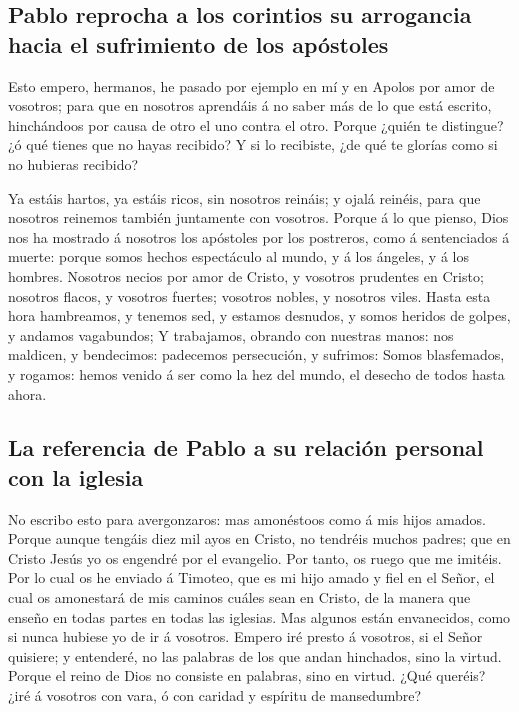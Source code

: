 \hypertarget{pablo-reprocha-a-los-corintios-su-arrogancia-hacia-el-sufrimiento-de-los-apuxf3stoles}{%
\subsection{Pablo reprocha a los corintios su arrogancia hacia el
sufrimiento de los
apóstoles}\label{pablo-reprocha-a-los-corintios-su-arrogancia-hacia-el-sufrimiento-de-los-apuxf3stoles}}

 Esto empero, hermanos, he pasado por ejemplo en mí y en
Apolos por amor de vosotros; para que en nosotros aprendáis á no saber
más de lo que está escrito, hinchándoos por causa de otro el uno contra
el otro.  Porque ¿quién te distingue? ¿ó qué tienes que no
hayas recibido? Y si lo recibiste, ¿de qué te glorías como si no
hubieras recibido?

 Ya estáis hartos, ya estáis ricos, sin nosotros reináis;
y ojalá reinéis, para que nosotros reinemos también juntamente con
vosotros.  Porque á lo que pienso, Dios nos ha mostrado á
nosotros los apóstoles por los postreros, como á sentenciados á muerte:
porque somos hechos espectáculo al mundo, y á los ángeles, y á los
hombres.  Nosotros necios por amor de Cristo, y vosotros
prudentes en Cristo; nosotros flacos, y vosotros fuertes; vosotros
nobles, y nosotros viles.  Hasta esta hora hambreamos, y
tenemos sed, y estamos desnudos, y somos heridos de golpes, y andamos
vagabundos;  Y trabajamos, obrando con nuestras manos:
nos maldicen, y bendecimos: padecemos persecución, y sufrimos:
 Somos blasfemados, y rogamos: hemos venido á ser como la
hez del mundo, el desecho de todos hasta ahora.

\hypertarget{la-referencia-de-pablo-a-su-relaciuxf3n-personal-con-la-iglesia}{%
\subsection{La referencia de Pablo a su relación personal con la
iglesia}\label{la-referencia-de-pablo-a-su-relaciuxf3n-personal-con-la-iglesia}}

 No escribo esto para avergonzaros: mas amonéstoos como á
mis hijos amados.  Porque aunque tengáis diez mil ayos en
Cristo, no tendréis muchos padres; que en Cristo Jesús yo os engendré
por el evangelio.  Por tanto, os ruego que me imitéis.
 Por lo cual os he enviado á Timoteo, que es mi hijo
amado y fiel en el Señor, el cual os amonestará de mis caminos cuáles
sean en Cristo, de la manera que enseño en todas partes en todas las
iglesias.  Mas algunos están envanecidos, como si nunca
hubiese yo de ir á vosotros.  Empero iré presto á
vosotros, si el Señor quisiere; y entenderé, no las palabras de los que
andan hinchados, sino la virtud.  Porque el reino de Dios
no consiste en palabras, sino en virtud.  ¿Qué queréis?
¿iré á vosotros con vara, ó con caridad y espíritu de mansedumbre?

